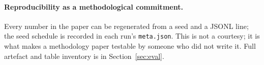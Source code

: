 \documentclass[10pt]{article}
\begin{document}
\paragraph{Reproducibility as a methodological commitment.} Every
number in the paper can be regenerated from a seed and a JSONL
line; the seed schedule is recorded in each run's
\texttt{meta.json}. This is not a courtesy; it is what makes a
methodology paper testable by someone who did not write it. Full
artefact and table inventory is in Section~\ref{sec:eval}.
\end{document}
